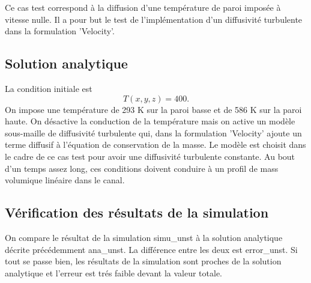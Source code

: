 Ce cas test correspond \`a la diffusion d'une temp\'erature de paroi impos\'ee \`a vitesse nulle. Il a pour but le test de l'impl\'ementation d'un diffusivit\'e turbulente dans la formulation 'Velocity'.

\subsection{Solution analytique}

La condition initiale est
\begin{equation}
T\left(x,y,z\right) = 400.
\end{equation}
On impose une temp\'erature de 293 K sur la paroi basse et de 586 K sur la paroi haute.
On d\'esactive la conduction de la temp\'erature mais on active un mod\`ele sous-maille de diffusivit\'e turbulente qui, dans la formulation 'Velocity' ajoute un terme diffusif \`a l'\'equation de conservation de la masse.
Le mod\`ele est choisit dans le cadre de ce cas test pour avoir une diffusivit\'e turbulente constante.
Au bout d'un temps assez long, ces conditions doivent conduire \`a un profil de mass volumique lin\'eaire dans le canal.

\subsection{V\'erification des r\'esultats de la simulation}

On compare le r\'esultat de la simulation {\textsf simu\_unst} \`a la solution analytique d\'ecrite pr\'ec\'edemment {\textsf ana\_unst}. La diff\'erence entre les deux est \textsf{error\_unst}. Si tout se passe bien, les r\'esultats de la simulation sont proches de la solution analytique et l'erreur est tr\'es faible devant la valeur totale.


